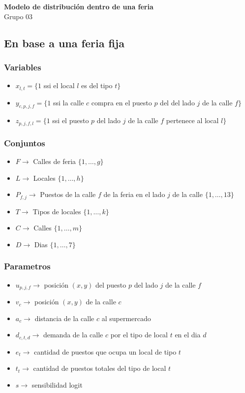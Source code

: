 \documentclass[12pt]{article}
\newcommand{\ra}{\rightarrow}
\newcommand{\grupo}{Grupo 03}
\newcommand{\problema}{Modelo de distribución dentro de una feria}
\begin{document}
\begin{center}
\vspace{0.5cm}
{\large\bf \problema}\\
\vspace{0.2cm}
\footnotesize{\grupo}
\end{center}

\subsection*{En base a una feria fija}

\subsubsection*{Variables}
\begin{itemize}
	\item[] $x_{l,t} = \{1$ ssi el local $l$ es del tipo $t\}$
	\item[] $y_{c,p,j,f} = \{1$ ssi la calle $c$ compra en el puesto $p$ del del lado $j$ de la calle $f\}$
	\item[] $z_{p,j,f,l} = \{1$ ssi el puesto $p$ del lado $j$ de la calle $f$ pertenece al local $l\}$
\end{itemize}

\subsubsection*{Conjuntos}
\begin{itemize}
	\item[] $F \ra$ Calles de feria $\{1, \dots , g\}$
	\item[] $L \ra$ Locales $\{1, \dots , h\}$
	\item[] $P_{f,j} \ra$ Puestos de la calle $f$ de la feria en el lado $j$ de la calle $\{1, \dots , 13\}$
	\item[] $T \ra$ Tipos de locales $\{1, \dots , k\}$
	\item[] $C \ra$ Calles $\{1, \dots , m\}$
	\item[] $D \ra$ Dias $\{1, \dots , 7\}$
\end{itemize}

\subsubsection*{Parametros}
\begin{itemize}
	\item[] $u_{p,j,f} \ra$ posición $(x, y)$ del puesto $p$ del lado $j$ de la calle $f$
	\item[] $v_c \ra$ posición $(x, y)$ de la calle $c$
	\item[] $a_c \ra$  distancia de la calle $c$ al supermercado
	\item[] $d_{c,t,d} \ra$ demanda de la calle $c$ por el tipo de local $t$ en el dia $d$
	\item[] $e_t \ra$  cantidad de puestos que ocupa un local de tipo $t$
	\item[] $t_t \ra$  cantidad de puestos totales del tipo de local $t$
	\item[] $s \ra$ sensibilidad logit
\end{itemize}
\end{document}
